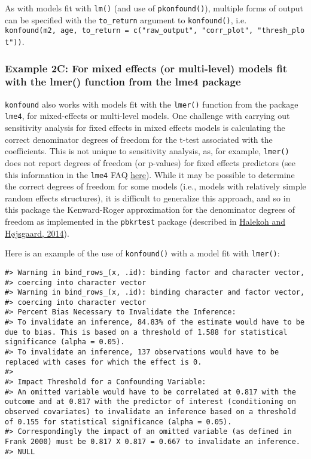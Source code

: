\documentclass[man]{apa6}
\begin{document}
As with models fit with \texttt{lm()} (and use of \texttt{pkonfound()}),
multiple forms of output can be specified with the \texttt{to\_return}
argument to \texttt{konfound()}, i.e.
\texttt{konfound(m2,\ age,\ to\_return\ =\ c("raw\_output",\ "corr\_plot",\ "thresh\_plot"))}.

\subsubsection{Example 2C: For mixed effects (or multi-level) models fit
with the lmer() function from the lme4
package}\label{example-2c-for-mixed-effects-or-multi-level-models-fit-with-the-lmer-function-from-the-lme4-package}

\texttt{konfound} also works with models fit with the \texttt{lmer()}
function from the package \texttt{lme4}, for mixed-effects or
multi-level models. One challenge with carrying out sensitivity analysis
for fixed effects in mixed effects models is calculating the correct
denominator degrees of freedom for the t-test associated with the
coefficients. This is not unique to sensitivity analysis, as, for
example, \texttt{lmer()} does not report degrees of freedom (or
p-values) for fixed effects predictors (see this information in the
\texttt{lme4} FAQ
\href{http://bbolker.github.io/mixedmodels-misc/glmmFAQ.html\#why-doesnt-lme4-display-denominator-degrees-of-freedomp-values-what-other-options-do-i-have}{here}).
While it may be possible to determine the correct degrees of freedom for
some models (i.e., models with relatively simple random effects
structures), it is difficult to generalize this approach, and so in this
package the Kenward-Roger approximation for the denominator degrees of
freedom as implemented in the \texttt{pbkrtest} package (described in
\href{https://www.jstatsoft.org/htaccess.php?volume=59\&type=i\&issue=09\&paper=true}{Halekoh
and Højsgaard, 2014}).

Here is an example of the use of \texttt{konfound()} with a model fit
with \texttt{lmer()}:

\begin{verbatim}
#> Warning in bind_rows_(x, .id): binding factor and character vector,
#> coercing into character vector
#> Warning in bind_rows_(x, .id): binding character and factor vector,
#> coercing into character vector
#> Percent Bias Necessary to Invalidate the Inference:
#> To invalidate an inference, 84.83% of the estimate would have to be due to bias. This is based on a threshold of 1.588 for statistical significance (alpha = 0.05).
#> To invalidate an inference, 137 observations would have to be replaced with cases for which the effect is 0.
#> 
#> Impact Threshold for a Confounding Variable:
#> An omitted variable would have to be correlated at 0.817 with the outcome and at 0.817 with the predictor of interest (conditioning on observed covariates) to invalidate an inference based on a threshold of 0.155 for statistical significance (alpha = 0.05).
#> Correspondingly the impact of an omitted variable (as defined in Frank 2000) must be 0.817 X 0.817 = 0.667 to invalidate an inference.
#> NULL
\end{verbatim}
\end{document}
